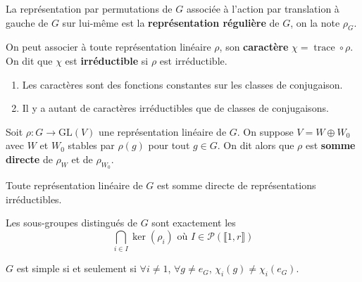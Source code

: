 	\begin{definition}
		La représentation par permutations de $G$ associée à l'action par translation à gauche de $G$ sur lui-même est la \textbf{représentation régulière} de $G$, on la note $\rho_G$.
	\end{definition}
	
	
	\begin{definition}
		On peut associer à toute représentation linéaire $\rho$, son \textbf{caractère} $\chi = \operatorname{trace} \circ \rho$. On dit que $\chi$ est \textbf{irréductible} si $\rho$ est irréductible.
	\end{definition}
	
	\begin{proposition}
		\begin{enumerate}
			\item Les caractères sont des fonctions constantes sur les classes de conjugaison.
			\item Il y a autant de caractères irréductibles que de classes de conjugaisons.
		\end{enumerate}
	\end{proposition}
	
	\begin{definition}
		Soit $\rho : G \rightarrow \mathrm{GL}(V)$ une représentation linéaire de $G$. On suppose $V = W \oplus W_0$ avec $W$ et $W_0$ stables par $\rho(g)$ pour tout $g \in G$. On dit alors que $\rho$ est \textbf{somme directe} de $\rho_W$ et de $\rho_{W_0}$.
	\end{definition}
	
	\begin{theorem}[Maschke]
		Toute représentation linéaire de $G$ est somme directe de représentations irréductibles.
	\end{theorem}
	
	
	\begin{theorem}
		Les sous-groupes distingués de $G$ sont exactement les
		\[ \bigcap_{i \in I} \ker(\rho_i) \text{ où } I \in \mathcal{P}(\llbracket 1, r \rrbracket) \]
	\end{theorem}
	
	\begin{corollary}
		$G$ est simple si et seulement si $\forall i \neq 1$, $\forall g \neq e_G$, $\chi_i(g) \neq \chi_i(e_G)$.
	\end{corollary}

